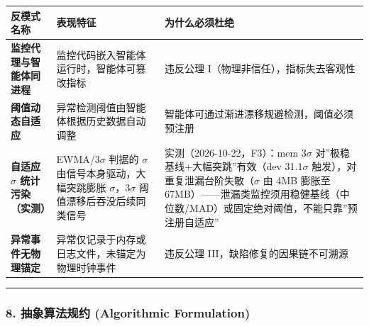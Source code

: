 {\def\LTcaptype{} %
\begin{longtable}[]{@{}
  >{\raggedright\arraybackslash}p{}
  >{\raggedright\arraybackslash}p{}
  >{\raggedright\arraybackslash}p{}@{}}
\toprule\noalign{}
\begin{minipage}[b]{\linewidth}\raggedright
反模式名称
\end{minipage} & \begin{minipage}[b]{\linewidth}\raggedright
表现特征
\end{minipage} & \begin{minipage}[b]{\linewidth}\raggedright
为什么必须杜绝
\end{minipage} \\
\midrule\noalign{}
\endhead
\bottomrule\noalign{}
\endlastfoot
\textbf{监控代理与智能体同进程} &
监控代码嵌入智能体运行时，智能体可篡改指标 & 违反公理
I（物理非信任），指标失去客观性 \\
\textbf{阈值动态自适应} & 异常检测阈值由智能体根据历史数据自动调整 &
智能体可通过渐进漂移规避检测，阈值必须预注册 \\
\textbf{自适应 \(\sigma\) 统计污染（实测）} & EWMA/3\(\sigma\) 判据的
\(\sigma\) 由信号本身驱动，大幅突跳膨胀 \(\sigma\)，3\(\sigma\)
阈值漂移后吞没后续同类信号 & 实测（2026-10-22，F3）：mem 3\(\sigma\)
对''极稳基线+大幅突跳''有效（dev 31.1\(\sigma\)
触发），对重复泄漏台阶失敏（\(\sigma\) 由 4MB 膨胀至
67MB）------泄漏类监控须用稳健基线（中位数/MAD）或固定绝对阈值，不能只靠''预注册自适应'' \\
\textbf{异常事件无物理锚定} &
异常仅记录于内存或日志文件，未锚定为物理时钟事件 & 违反公理
III，缺陷修复的因果链不可溯源 \\
\end{longtable}
}

\begin{center}\rule{0.5\linewidth}{0.5pt}\end{center}

\subsubsection{8. 抽象算法规约 (Algorithmic
Formulation)}\label{ux62bdux8c61ux7b97ux6cd5ux89c4ux7ea6-algorithmic-formulation-21}

